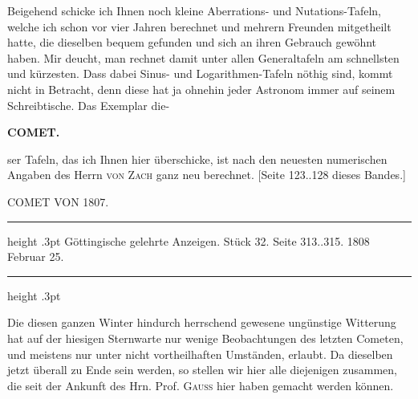 \par\indent Beigehend schicke ich Ihnen noch kleine Aberrations- und Nutations-Tafeln, welche ich schon vor
vier Jahren berechnet und mehrern Freunden mitgetheilt hatte, die dieselben bequem gefunden und
sich an ihren Gebrauch gewöhnt haben. Mir deucht, man rechnet damit unter allen Generaltafeln am
schnellsten und kürzesten. Dass dabei Sinus- und Logarithmen-Tafeln nöthig sind, kommt nicht in
Betracht, denn diese hat ja ohnehin jeder Astronom immer auf seinem Schreibtische. Das Exemplar
die-\par
{}
\clearpage
\thispagestyle{empty}
\noindent{}%
%
\parbox[t]{\dimexpr\linewidth-24mm\relax}{\centering\footnotesize\bfseries COMET.\par}%
\makebox[12mm][r]{}\par\nobreak\medskip
\noindent ser Tafeln, das ich Ihnen hier überschicke, ist nach den neuesten numerischen Angaben des Herrn
\textsc{von Zach} ganz neu berechnet. [Seite 123..128 dieses Bandes.]

\par{}

\par\bigskip
{}
\begin{center}
\large COMET VON 1807.
\end{center}

\begin{center}
\parbox{.77\linewidth}{%
\centering\fontsize{8.2}{10.2}\selectfont
\hrule height .3pt\relax\vspace{2.5pt}
Göttingische gelehrte Anzeigen. Stück 32. Seite 313..315. 1808 Februar 25.\par
\vspace{2.5pt}\hrule height .3pt\relax
}
\end{center}

\par\indent Die diesen ganzen Winter hindurch herrschend gewesene ungünstige Witterung hat auf der hiesigen
Sternwarte nur wenige Beobachtungen des letzten Cometen, und meistens nur unter nicht
vortheilhaften Umständen, erlaubt. Da dieselben jetzt überall zu Ende sein werden, so stellen wir
hier alle diejenigen zusammen, die seit der Ankunft des Hrn. Prof. \textsc{Gauss} hier haben
gemacht werden können.


